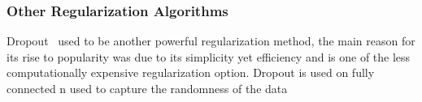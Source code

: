 \subsubsection{Other Regularization Algorithms}

Dropout~\cite{JMLR:v15:srivastava14a} used to be another powerful regularization method, the main reason for its rise to popularity was due to its simplicity yet efficiency and is one of the less computationally expensive regularization option. Dropout is used on fully connected n used to capture the randomness of the data